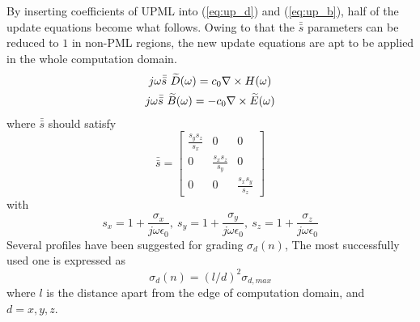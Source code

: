 By inserting coefficients of UPML into (\ref{eq:up_d}) and (\ref{eq:up_b}), half of the update equations become what
follows. Owing to that the $\bar{\bar{s}}$ parameters can be reduced to $1$ in non-PML regions, the new update equations
are apt to be applied in the whole computation domain.
\begin{gather}
  j\omega\bar{\bar{s}}\ \widetilde{D}(\omega) = c_0\nabla\times H(\omega)\\
  j\omega\bar{\bar{s}}\ \widetilde{B}(\omega) = -c_0\nabla\times \widetilde{E}(\omega)
\end{gather}
where $\bar{\bar{s}}$ should satisfy
\begin{equation}
  \bar{\bar{s}} = 
  \begin{bmatrix}
    \displaystyle\frac{s_ys_z}{s_x}& 0& 0\\
    0& \displaystyle\frac{s_xs_z}{s_y}& 0\\
    0& 0& \displaystyle\frac{s_xs_y}{s_z}
  \end{bmatrix}
\end{equation}
with 
\begin{equation}\label{eq:pmlco}
  s_x = 1 + \frac{\sigma_x}{j\omega\epsilon_0},\ 
  s_y = 1 + \frac{\sigma_y}{j\omega\epsilon_0},\ 
  s_z = 1 + \frac{\sigma_z}{j\omega\epsilon_0}
\end{equation}
Several profiles have been suggested for grading $\sigma_d(n)$, The most successfully used one is expressed as
\begin{equation}
  \sigma_d(n) = (l/d)^2\sigma_{d,max}
\end{equation}
where $l$ is the distance apart from the edge of computation domain, and $d = x,y,z$.


